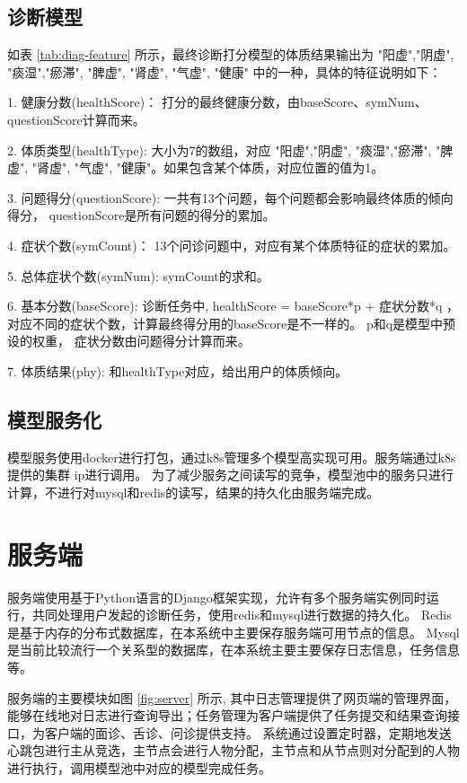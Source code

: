 \subsection{诊断模型}

如表 \ref{tab:diag-feature} 所示，最终诊断打分模型的体质结果输出为 "阳虚","阴虚", "痰湿","瘀滞", "脾虚", "肾虚", "气虚", "健康" 中的一种，具体的特征说明如下：

1. 健康分数(healthScore)： 打分的最终健康分数，由baseScore、symNum、questionScore计算而来。

2. 体质类型(healthType): 大小为7的数组，对应 "阳虚","阴虚", "痰湿","瘀滞", "脾虚", "肾虚", "气虚", "健康"。如果包含某个体质，对应位置的值为1。

3. 问题得分(questionScore): 一共有13个问题，每个问题都会影响最终体质的倾向得分， questionScore是所有问题的得分的累加。

4. 症状个数(symCount)： 13个问诊问题中，对应有某个体质特征的症状的累加。

5. 总体症状个数(symNum): symCount的求和。

6. 基本分数(baseScore): 诊断任务中, healthScore = baseScore*p + 症状分数*q ，对应不同的症状个数，计算最终得分用的baseScore是不一样的。 
p和q是模型中预设的权重， 症状分数由问题得分计算而来。

7. 体质结果(phy): 和healthType对应，给出用户的体质倾向。

\subsection{模型服务化}

模型服务使用docker进行打包，通过k8s管理多个模型高实现可用。服务端通过k8s提供的集群 ip进行调用。
为了减少服务之间读写的竞争，模型池中的服务只进行计算，不进行对mysql和redis的读写，结果的持久化由服务端完成。

\section{服务端}

服务端使用基于Python语言的Django框架实现，允许有多个服务端实例同时运行，共同处理用户发起的诊断任务，使用redis和mysql进行数据的持久化。
Redis是基于内存的分布式数据库，在本系统中主要保存服务端可用节点的信息。
Mysql是当前比较流行一个关系型的数据库，在本系统主要主要保存日志信息，任务信息等。       

服务端的主要模块如图 \ref{fig:server} 所示, 其中日志管理提供了网页端的管理界面，能够在线地对日志进行查询导出；任务管理为客户端提供了任务提交和结果查询接口，为客户端的面诊、舌诊、问诊提供支持。
系统通过设置定时器，定期地发送心跳包进行主从竞选，主节点会进行人物分配，主节点和从节点则对分配到的人物进行执行，调用模型池中对应的模型完成任务。


